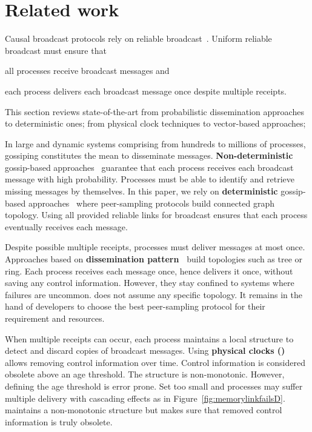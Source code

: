 
\section{Related work}
\label{sec:relatedwork}

Causal broadcast protocols rely on reliable
broadcast~\cite{hadzilacos1994modular}. Uniform reliable broadcast must ensure
that
\begin{inparaenum}[(i)]
\item all processes receive broadcast messages and
\item each process delivers each broadcast message once despite multiple
  receipts.
\end{inparaenum} This section reviews state-of-the-art from probabilistic
dissemination approaches to deterministic ones; from physical clock techniques
to vector-based approaches;

In large and dynamic systems comprising from hundreds to millions of processes,
gossiping constitutes the mean to disseminate
messages. \textbf{Non-deterministic} gossip-based
approaches~\cite{birman1999bimodal,demers1987epidemic} guarantee that each
process receives each broadcast message with high probability. Processes must be
able to identify and retrieve missing messages by themselves. In this paper, we
rely on \textbf{deterministic} gossip-based
approaches~\cite{nedelec2017adaptive} where peer-sampling protocols build
connected graph topology. Using all provided reliable links for broadcast
ensures that each process eventually receives each message.

Despite possible multiple receipts, processes must deliver messages at most
once. Approaches based on \textbf{dissemination
  pattern~\cite{bravo2017saturn,raynal2013distributed}} build topologies such as
tree or ring. Each process receives each message once, hence delivers it once,
without saving any control information. However, they stay confined to systems
where failures are uncommon. \RPCBROADCAST does not assume any specific
topology. It remains in the hand of developers to choose the best peer-sampling
protocol for their requirement and resources.

When multiple receipts can occur, each process maintains a local structure to
detect and discard copies of broadcast messages. Using \textbf{physical clocks
  (\REF)} allows removing control information over time. Control information is
considered obsolete above an age threshold. The structure is
non-monotonic. However, defining the age threshold is error prone. Set too small
and processes may suffer multiple delivery with cascading effects as in
Figure~\ref{fig:memorylinkfailsD}. \RPCBROADCAST maintains a non-monotonic
structure but makes sure that removed control information is truly obsolete.

